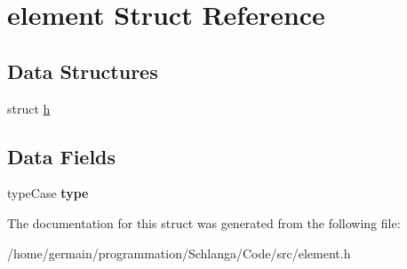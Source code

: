 \hypertarget{structelement}{\section{element Struct Reference}
\label{structelement}
}
\subsection*{Data Structures}
\begin{DoxyCompactItemize}
\item 
struct \hyperlink{structelement_1_1h}{h}
\end{DoxyCompactItemize}
\subsection*{Data Fields}
\begin{DoxyCompactItemize}
\item 
\hypertarget{structelement_ae8958a294110f48590d1db3b2cbe9783}{type\-Case {\bfseries type}}\label{structelement_ae8958a294110f48590d1db3b2cbe9783}

\end{DoxyCompactItemize}


The documentation for this struct was generated from the following file\-:\begin{DoxyCompactItemize}
\item 
/home/germain/programmation/\-Schlanga/\-Code/src/element.\-h\end{DoxyCompactItemize}
